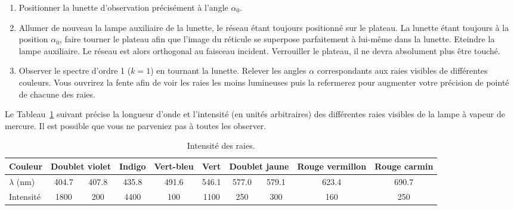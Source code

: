 \documentclass[../main/main.tex]{subfiles}
\begin{document}
\begin{enumerate}
    \item Positionner la lunette d'observation précisément à l'angle $\alpha_0$. 

    \item Allumer de nouveau la lampe auxiliaire de la lunette, le réseau étant
        toujours positionné sur le plateau. La lunette étant toujours à la
        position $\alpha_0$, faire tourner le plateau afin que l'image du
        réticule se superpose parfaitement à lui-même dans la lunette. Eteindre
        la lampe auxiliaire. Le réseau est alors orthogonal au faisceau
        incident. Verrouiller le plateau, il ne devra absolument plus être
        touché.

    \item Observer le spectre d'ordre 1 ($k = 1$) en tournant la lunette.
        Relever les angles $\alpha$ correspondants aux raies visibles de
        différentes couleurs. Vous ouvrirez la fente afin de voir les raies les
        moins lumineuses puis la refermerez pour augmenter votre précision de
        pointé de chacune des raies.
\end{enumerate}

Le Tableau~\ref{tab:raiesint} suivant précise la longueur d'onde et l'intensité
(en unités arbitraires) des différentes raies visibles de la lampe à vapeur de
mercure. Il est possible que vous ne parveniez pas à toutes les observer.

\begin{table}[htbp]
  \centerfloat
  \caption{Intensité des raies.}
  \begin{tabular}{lccccccccc}
    \toprule
    Couleur &
    \multicolumn{2}{c}{Doublet violet} &
    Indigo &
    Vert-bleu &
    Vert &
    \multicolumn{2}{c}{Doublet jaune} &
    Rouge vermillon &
    Rouge carmin
    \\
    \midrule
    $\lambda$ (\si{nm}) &
    \num{404.7} &
    \num{407.8} &
    \num{435.8} &
    \num{491.6} &
    \num{546.1} &
    \num{577.0} &
    \num{579.1} &
    \num{623.4} &
    \num{690.7}
    \\
    Intensité &
    \num{1800} &
    \num{200} &
    \num{4400} &
    \num{100} &
    \num{1100} &
    \num{250} &
    \num{300} &
    \num{160} &
    \num{250}
    \\
    \bottomrule
  \end{tabular}
  \label{tab:raiesint}
\end{table}
\end{document}
